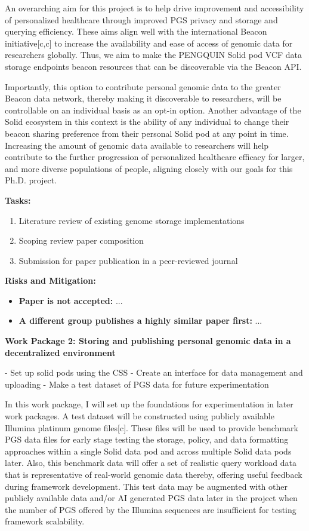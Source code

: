 \documentclass[11pt]{article}
\begin{document}
An overarching aim for this project is to help drive improvement and accessibility of personalized healthcare through improved PGS privacy and storage and querying efficiency. 
These aims align well with the international Beacon initiative[c,c] to increase the availability and ease of access of genomic data for researchers globally. 
Thus, we aim to make the PENGQUIN Solid pod VCF data storage endpoints beacon resources that can be discoverable via the Beacon API.

Importantly, this option to contribute personal genomic data to the greater Beacon data network, thereby making it discoverable to researchers, will be controllable on an individual basis as an opt-in option. 
Another advantage of the Solid ecosystem in this context is the ability of any individual to change their beacon sharing preference from their personal Solid pod at any point in time. 
Increasing the amount of genomic data available to researchers will help contribute to the further progression of personalized healthcare efficacy for larger, and more diverse populations of people, aligning closely with our goals for this Ph.D. project.

\textbf{Tasks:} 
\begin{enumerate}
	\item Literature review of existing genome storage implementations
	\item Scoping review paper composition
	\item Submission for paper publication in a peer-reviewed journal
\end{enumerate}

\textbf{Risks and Mitigation:}  
\begin{itemize}
	\item \textbf{Paper is not accepted:} ... 
	\item \textbf{A different group publishes a highly similar paper first:} ...
\end{itemize}

\textbf{Work Package 2: Storing and publishing personal genomic data in a decentralized environment} 

- Set up solid pods using the CSS
- Create an interface for data management and uploading
- Make a test dataset of PGS data for future experimentation

In this work package, I will set up the foundations for experimentation in later work packages. 
A test dataset will be constructed using publicly available Illumina platinum genome files[c]. 
These files will be used to provide benchmark PGS data files for early stage testing the storage, policy, and data formatting approaches within a single Solid data pod and across multiple Solid data pods later. 
Also, this benchmark data will offer a set of realistic query workload data that is representative of real-world genomic data thereby, offering useful feedback during framework development. 
This test data may be augmented with other publicly available data and/or AI generated PGS data later in the project when the number of PGS offered by the Illumina sequences are insufficient for testing framework scalability.
\end{document}
